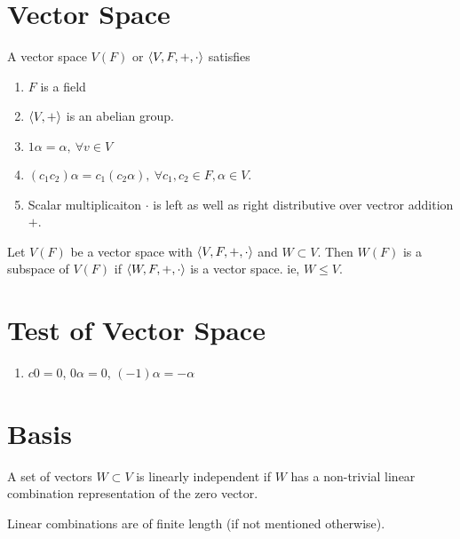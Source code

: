 \section{Vector Space}
\begin{definition}
	A vector space $V(F)$ or $\left\langle V,F,+,\cdot \right\rangle$ satisfies
	\begin{enumerate}
		\item $F$ is a field
		\item $\left\langle V,+ \right\rangle$ is an abelian group.
		\item $1\alpha=\alpha,\ \forall v \in V$
		\item $(c_1c_2)\alpha = c_1 (c_2\alpha),\ \forall c_1,c_2 \in F, \alpha \in V$.
		\item Scalar multiplicaiton $\cdot$ is left as well as right distributive over vectror addition $+$.
	\end{enumerate}
\end{definition}

\begin{definition}[subspace]
	Let $V(F)$ be a vector space with $\left\langle V,F,+,\cdot \right\rangle$ and $W \subset V$.
	Then $W(F)$ is a subspace of $V(F)$ if $\left\langle W,F,+,\cdot \right\rangle$ is a vector space.
	ie, $W \le V$.
\end{definition}

\section{Test of Vector Space}
\begin{enumerate}
	\item $c0 = 0$, $0\alpha = 0$, $(-1)\alpha = -\alpha$
\end{enumerate}

\section{Basis}
\begin{definition}
	A set of vectors $W \subset V$ is linearly independent if $W$ has a non-trivial linear combination representation of the zero vector.
\end{definition}
\begin{note}
	Linear combinations are of finite length (if not mentioned otherwise).
\end{note}


